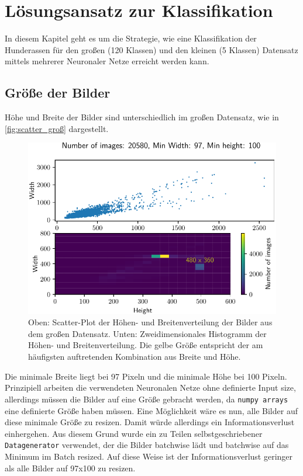 \chapter{Lösungsansatz zur Klassifikation}
In diesem Kapitel geht es um die Strategie, wie eine Klassifikation der
Hunderassen für den großen (120 Klassen) und den kleinen (5 Klassen) Datensatz
mittels mehrerer Neuronaler Netze erreicht werden kann.

\section{Größe der Bilder}
Höhe und Breite der Bilder sind unterschiedlich im großen Datensatz, wie in
\autoref{fig:scatter_groß} dargestellt.

\begin{figure}
  \centering
  \includegraphics[scale=0.8]{pics/width_height_scatter_hist2d.pdf}
  \caption{Oben: Scatter-Plot der Höhen- und Breitenverteilung der Bilder aus dem großen Datensatz.
  Unten: Zweidimensionales Histogramm der Höhen- und Breitenverteilung.
  Die gelbe Größe entspricht der am häufigsten auftretenden Kombination
  aus Breite und Höhe.}
  \label{fig:scatter_groß}
\end{figure}

Die minimale Breite liegt bei 97 Pixeln und die minimale Höhe bei 100 Pixeln.
Prinzipiell arbeiten die verwendeten Neuronalen Netze ohne definierte Input
size, allerdings müssen die Bilder auf eine Größe gebracht werden, da
\texttt{numpy arrays} eine definierte Größe haben müssen. Eine Möglichkeit wäre
es nun, alle Bilder auf diese minimale Größe zu resizen. Damit würde allerdings
ein Informationsverlust einhergehen. Aus diesem Grund wurde ein zu Teilen
selbstgeschriebener \texttt{Datagenerator} verwendet, der die Bilder batchwise
lädt und batchwise auf das Minimum im Batch resized. Auf diese Weise ist der
Informationsverlust geringer als alle Bilder auf 97x100 zu resizen.

